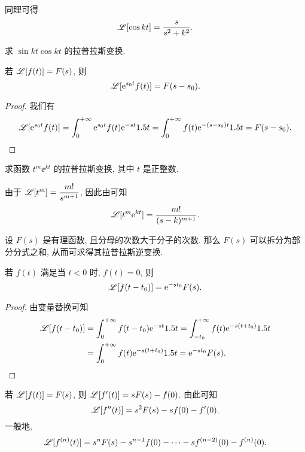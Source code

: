 同理可得
\[
  \mathscr{L}[\cos kt]=\frac{s}{s^2+k^2}.
\]

\begin{exercise}
  求 $\sin{kt}\cos{kt}$ 的拉普拉斯变换.
\end{exercise}

\begin{theorem}[位移性质]
  \label{thm:laplace-shift-property}
  若 $\mathscr{L}[f(t)]=F(s)$, 则 
  \[
    \mathscr{L}[\mathrm{e}^{s_0 t}f(t)]=F(s-s_0).
  \]
\end{theorem}

\begin{proof}
  我们有
  \begin{align*}
     \mathscr{L}[\mathrm{e}^{s_0 t}f(t)]
    =\displaystyle\int_0^{+\infty} \mathrm{e}^{s_0 t}f(t)\mathrm{e}^{-st}1.5 t
    =\displaystyle\int_0^{+\infty} f(t)\mathrm{e}^{-(s-s_0) t}1.5 t
     =F(s-s_0).\qedhere
  \end{align*}
\end{proof}

\begin{example}
  求函数 $t^m\ee^{kt}$ 的拉普拉斯变换, 其中 $t$ 是正整数.
\end{example}

\begin{solution}
  由于 $\mathscr{L}[t^m]=\dfrac{m!}{s^{m+1}}$, 因此由\thmLShift 可知
  \[
    \mathscr{L}[t^m\mathrm{e}^{kt}]=\frac{m!}{(s-k)^{m+1}}.
  \]
\end{solution}

设 $F(s)$ 是有理函数, 且分母的次数大于分子的次数.
那么 $F(s)$ 可以拆分为部分分式之和, 从而可求得其拉普拉斯逆变换.

\begin{theorem}[延迟性质]
  若 $f(t)$ 满足当 $t<0$ 时, $f(t)=0$, 则
  \[
    \mathscr{L}[f(t-t_0)]=\mathrm{e}^{-s t_0}F(s).
  \]
\end{theorem}

\begin{proof}
  由变量替换可知
  \begin{align*}
      \mathscr{L}[f(t-t_0)]
    &=\displaystyle\int_0^{+\infty} f(t-t_0)\mathrm{e}^{-s t}1.5 t
     =\int_{-t_0}^{+\infty} f(t)\mathrm{e}^{-s(t+t_0)}1.5 t\\
    &=\displaystyle\int_0^{+\infty} f(t)\mathrm{e}^{-s(t+t_0)}1.5 t
     =\mathrm{e}^{-s t_0}F(s).\qedhere
  \end{align*}
\end{proof}

\begin{theorem}[微分性质]
  \label{thm:laplace-differential-property}
  若 $\mathscr{L}[f(t)]=F(s)$, 则 $\mathscr{L}[f'(t)]=sF(s)-f(0)$.
  由此可知
  \[
    \mathscr{L}[f''(t)]=s^2F(s)-sf(0)-f'(0).
  \]
  一般地,
  \[
    \mathscr{L}[f^{(n)}(t)]=s^nF(s)-s^{n-1}f(0)-\cdots-sf^{(n-2)}(0)-f^{(n)}(0).
  \]
\end{theorem}


